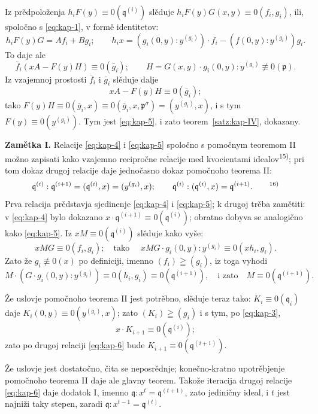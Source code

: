 \documentclass[11pt]{article}
\theoremstyle{plain}
\begin{document}
Iz prědpoloženja $h_{i}F(y) \equiv 0(\mathfrak{q}^{(i)})$
slěduje
$h_{i}F(y)G(x,y) \equiv 0(f_{i}, g_{i})$, ili, spoločno
s \eqref{eq:kap-1}, v formě identitetov:
\[
h_{i}F(y)G = Af_{i} + Bg_{i}; \qquad
h_{i}x = (g_{i}(0,y):y^{(g_{i})})\cdot f_{i}
- (f(0,y):y^{(g_{i})})g_{i}.
\]
To daje ale
\[
\bar{f}_{i}(xA - F(y)H) \equiv 0(\bar{g}_{i}); \qquad
H = G(x,y) \cdot g_{i}(0,y) : y^{(g_{i})} \not\equiv 0(\mathfrak{p}).
\]
Iz vzajemnoj prostosti $\bar{f}_{i}$ i $\bar{g}_{i}$ slěduje dalje
\[
xA - F(y)H \equiv 0(\bar{g}_{i});
\]
tako $F(y)H \equiv 0(\bar{g}_{i}, x)
\equiv 0(\bar{g}_{i}, x, \mathfrak{p}^{\sigma})
= (y^{(g_{i})}, x)$, i s tym $F(y) \equiv 0(y^{(g_{i})})$.
Tym jest \eqref{eq:kap-5}, i zato teorem~\ref{satz:kap-IV}, dokazany.

\smallskip
\textbf{Zamětka I.} Relacije \eqref{eq:kap-4} i \eqref{eq:kap-5}
spoločno s pomočnym teoremom II možno zapisati kako vzajemno
recipročne relacije med kvocientami idealov\textsuperscript{15)};
pri tom dokaz drugoj relacije daje jednočasno dokaz pomočnoho
teorema II:
\begin{equation}\label{eq:kap-6}
\mathfrak{q}^{(i)} : \mathfrak{q}^{(i+1)}
= (\mathfrak{q}^{(i)}, x) = (y^{(g_{i})}, x); \qquad
\mathfrak{q}^{(i)} : (\mathfrak{q}^{(i)}, x)
= \mathfrak{q}^{(i+1)}.\qquad\text{\textsuperscript{16)}}
\end{equation}
Prva relacija prědstavja sjedinenje \eqref{eq:kap-4} i
\eqref{eq:kap-5}; k drugoj trěba zamětiti: v \eqref{eq:kap-4}
bylo dokazano
$x \cdot \mathfrak{q}^{(i+1)} \equiv 0(\mathfrak{q}^{(i)})$;
obratno dobyva se analogično kako \eqref{eq:kap-5}. Iz
$xM \equiv 0(\mathfrak{q}^{(i)})$ slěduje kako vyše:
\[
xMG \equiv 0(f_{i}, g_{i}); \quad \text{tako }\quad
xMG \cdot g_{i}(0,y) : y^{(g_{i})}
\equiv 0(xh_{i}, g_{i}).
\]
Zato že $g_{i} \not\equiv 0(x)$ po definiciji, imenno
$(f_i)\geqq(g_i)$, iz toga vyhodi
\[
M \cdot (G \cdot g_{i}(0,y) : y^{(g_{i})})
\equiv 0(h_{i}, g_{i}) \equiv 0(\mathfrak{q}^{(i+1)}),
\quad\text{i zato}\quad M \equiv 0(\mathfrak{q}^{(i+1)}).
\]

Že uslovje pomočnoho teorema II jest potrěbno, slěduje teraz tako:
$K_i\equiv0(\mathfrak{q}_i)$ daje
$K_{i}(0,y) \equiv 0(y^{(g_{i})}, x)$; zato
$(K_i)\geqq(g_i)$ i s tym, po \eqref{eq:kap-3},
\[
x \cdot K_{i+1} \equiv 0(\mathfrak{q}^{(i)});
\]
zato po drugoj relaciji \eqref{eq:kap-6} bude
$K_{i+1} \equiv 0(\mathfrak{q}^{(i+1)})$.

Že uslovje jest dostatočno, čita se neposrědnje; konečno-kratno
upotrěbjenje pomočnoho teorema II daje ale glavny teorem. Takože
iteracija drugoj relacije \eqref{eq:kap-6} daje dodatok I, imenno
$\mathfrak{q} : x^{t} = \mathfrak{q}^{(t+1)}$, zato jediničny
ideal, i $t$ jest najniži taky stepen, zaradi
$\mathfrak{q} : x^{t-1} = \mathfrak{q}^{(t)}$.
\end{document}
